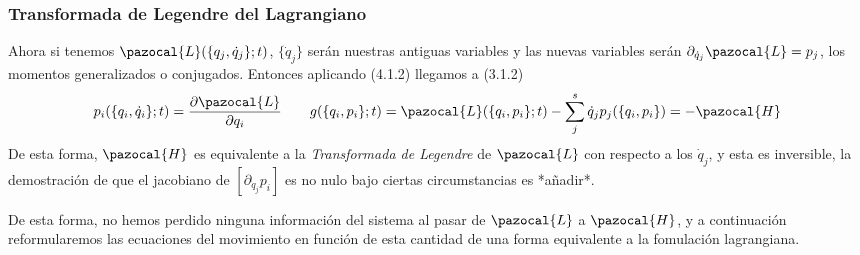 \subsubsection{Transformada de Legendre del Lagrangiano}
Ahora si tenemos $\pazocal{L}(\{q_j,\dot{q}_j\};t)$, $\{\dot{q}_j\}$ serán nuestras antiguas variables y las nuevas variables serán $\partial_{\dot{q}_j}\pazocal{L}=p_j$, los momentos generalizados o conjugados. Entonces aplicando (4.1.2) llegamos a (3.1.2)
\begin{equation} \label{4.1.3}
        p_i(\{q_i,\dot{q}_i\};t)=\frac{\partial \pazocal{L}}{\partial q_i} \ \ \ \ \ \  g(\{q_i,p_i\};t) =\pazocal{L}(\{q_i,p_i\};t) -\sum_j^s \dot{q}_j p_j(\{q_i,p_i\}) = -\pazocal{H}
\end{equation} 
De esta forma, $\pazocal{H}$ es equivalente a la \textit{Transformada de Legendre} de $\pazocal{L}$ con respecto a los $\dot{q}_j$, y esta es inversible, la demostración de que el jacobiano de $[\partial_{\dot{q}_j}p_i]$ es no nulo bajo ciertas circumstancias es *añadir*.

De esta forma, no hemos perdido ninguna información del sistema al pasar de $\pazocal{L}$ a $\pazocal{H}$, y a continuación reformularemos las ecuaciones del movimiento en función de esta cantidad de una forma equivalente a la fomulación lagrangiana.
